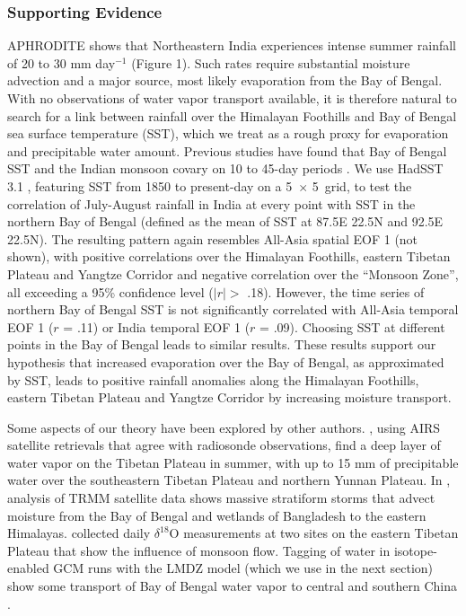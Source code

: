 \documentclass[12pt]{article}
\begin{document}
\subsubsection{Supporting Evidence}

	APHRODITE shows that Northeastern India experiences intense summer rainfall of 20 to 30 mm day$^{-1}$ (Figure 1). Such rates require substantial moisture advection and a major source, most likely evaporation from the Bay of Bengal. With no observations of water vapor transport available, it is therefore natural to search for a link between rainfall over the Himalayan Foothills and Bay of Bengal sea surface temperature (SST), which we treat as a rough proxy for evaporation and precipitable water amount. Previous studies have found that Bay of Bengal SST and the Indian monsoon covary on 10 to 45-day periods \citep{Vecchi2002,Han2006}. We use HadSST 3.1 \citep{Kennedy2011a,Kennedy2011}, featuring SST from 1850 to present-day on a 5\textdegree\ $\times$ 5\textdegree\ grid, to test the correlation of July-August rainfall in India at every point with SST in the northern Bay of Bengal (defined as the mean of SST at 87.5\textdegree E 22.5\textdegree N and 92.5\textdegree E 22.5\textdegree N). The resulting pattern again resembles All-Asia spatial EOF 1 (not shown), with positive correlations over the Himalayan Foothills, eastern Tibetan Plateau and Yangtze Corridor and negative correlation over the ``Monsoon Zone'', all exceeding a 95\% confidence level ($\lvert r \rvert >$ .18). However, the time series of northern Bay of Bengal SST is not significantly correlated with All-Asia temporal EOF 1 ($r$ = .11) or India temporal EOF 1 ($r$ = .09). Choosing SST at different points in the Bay of Bengal leads to similar results. These results support our hypothesis that increased evaporation over the Bay of Bengal, as approximated by SST, leads to positive rainfall anomalies along the Himalayan Foothills, eastern Tibetan Plateau and Yangtze Corridor by increasing moisture transport.
		
	Some aspects of our theory have been explored by other authors. \cite{Zhang2013}, using AIRS satellite retrievals that agree with radiosonde observations, find a deep layer of water vapor on the Tibetan Plateau in summer, with up to 15 mm of precipitable water over the southeastern Tibetan Plateau and northern Yunnan Plateau. In \cite{Medina2010}, analysis of TRMM satellite data shows massive stratiform storms that advect moisture from the Bay of Bengal and wetlands of Bangladesh to the eastern Himalayas. \cite{Gao2011} collected daily ${\delta}^{18}$O measurements at two sites on the eastern Tibetan Plateau that show the influence of monsoon flow. Tagging of water in isotope-enabled GCM runs with the LMDZ model (which we use in the next section) show some transport of Bay of Bengal water vapor to central and southern China \citep{Yao2013}.
	
\end{document}
